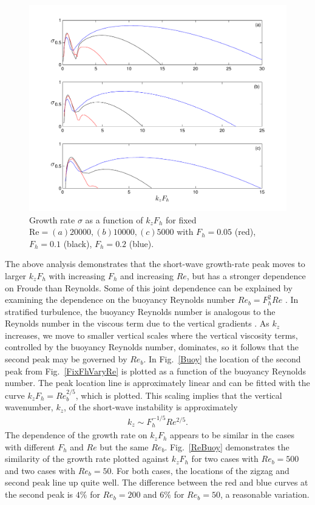 \begin{figure}
\begin{center}
\includegraphics[width=\textwidth]{fixed_reynolds_varying_froude}
\caption{Growth rate $\sigma$ as a function of $k_{z}F_{h}$ for fixed $\text{Re}=(a) 20000, (b) 10000, (c) 5000$ with $F_{h}=0.05$ (red), $F_{h}=0.1$ (black), $F_{h}=0.2$ (blue).}
\label{FixReVaryFh}
\end{center}
\end{figure}
The above analysis demonstrates that the short-wave growth-rate peak moves to larger $k_{z}F_{h}$ with increasing $F_{h}$ and increasing $Re$, but has a stronger dependence on Froude than Reynolds. Some of this joint dependence can be explained by examining the dependence on the buoyancy Reynolds number $Re_{b}=F_{h}^{2}Re$ \cite{riley2003,hebert2006,brethouwer2007}. In stratified turbulence, the buoyancy Reynolds number is analogous to the Reynolds number in the viscous term due to the vertical gradients \cite{brethouwer2007}. As $k_{z}$ increases, we move to smaller vertical scales where the vertical viscosity terms, controlled by the buoyancy Reynolds number, dominates, so it follows that the second peak may be governed by $Re_{b}$. In Fig.~\ref{Buoy} the location of the second peak from Fig.~\ref{FixFhVaryRe} is plotted as a function of the buoyancy Reynolds number. The peak location line is approximately linear and can be fitted with the curve $k_{z}F_{h}= Re_{b}^{2/5}$, which is plotted. This scaling implies that the vertical wavenumber, $k_{z}$, of the short-wave instability is approximately 
\begin{align}
k_{z} \sim F_{h}^{-1/5} Re^{2/5}\label{buoyscale}.
\end{align} 
The dependence of the growth rate on $k_{z}F_{h}$ appears to be similar in the cases with different $F_{h}$ and $Re$ but the same $Re_{b}$. Fig.~\ref{ReBuoy} demonstrates the similarity of the growth rate plotted against $k_{z}F_{h}$ for two cases with $Re_{b}=500$ and two cases with $Re_{b}=50$. For both cases, the locations of the zigzag and second peak line up quite well. The difference between the red and blue curves at the second peak is $4\%$ for $Re_{b}=200$ and $6\%$ for $Re_{b}=50$, a reasonable variation. 

